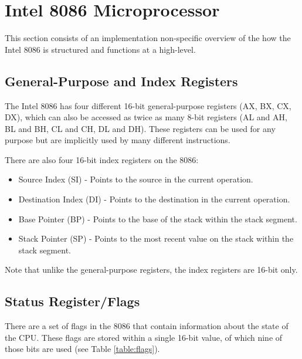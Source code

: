 \section{Intel 8086 Microprocessor}

This section consists of an implementation non-specific overview of the how the Intel 8086 is structured and functions at a high-level.

\subsection{General-Purpose and Index Registers}
    The Intel 8086 has four different 16-bit general-purpose registers (AX, BX, CX, DX), which can also be accessed as twice as many 8-bit registers (AL and AH, BL and BH, CL and CH, DL and DH). These registers can be used for any purpose but are implicitly used by many different instructions.

    There are also four 16-bit index registers on the 8086:
    \begin{itemize}
        \item Source Index (SI) - Points to the source in the current operation.
        \item Destination Index (DI) - Points to the destination in the current operation.
        \item Base Pointer (BP) - Points to the base of the stack within the stack segment.
        \item Stack Pointer (SP) - Points to the most recent value on the stack within the stack segment.
    \end{itemize}
    Note that unlike the general-purpose registers, the index registers are 16-bit only.

\subsection{Status Register/Flags}
    There are a set of flags in the 8086 that contain information about the state of the CPU. These flags are stored within a single 16-bit value, of which nine of those bits are used (see Table \ref{table:flags}).

